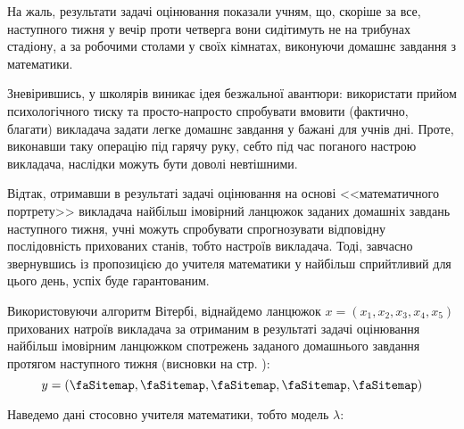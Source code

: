 \vspace{0.2cm}
\begin{mdframed}[style=text box, topline=false, bottomline=false, rightmargin=0cm, leftmargin=0cm]
    \hspace{\tabsize}
    На жаль, результати задачі оцінювання показали учням, що, скоріше за все, наступного тижня у вечір проти четверга вони сидітимуть не на трибунах стадіону, а за робочими столами у своїх кімнатах, виконуючи домашнє завдання з математики.
    
    Зневірившись, у школярів виникає ідея безжальної авантюри: використати прийом психологічного тиску та просто-напросто спробувати вмовити (фактично, благати) викладача задати легке домашнє завдання у бажані для учнів дні. Проте, виконавши таку операцію під гарячу руку, себто під час поганого настрою викладача, наслідки можуть бути доволі невтішними.
    
    Відтак, отримавши в результаті задачі оцінювання на основі <<математичного портрету>> викладача найбільш імовірний ланцюжок заданих домашніх завдань наступного тижня, учні можуть спробувати спрогнозувати відповідну послідовність прихованих станів, тобто настроїв викладача. Тоді, завчасно звернувшись із пропозицією до учителя математики у найбільш сприйтливий для цього день, успіх буде гарантованим.
\end{mdframed}

\vspace{0.2cm}
Використовуючи алгоритм Вітербі, віднайдемо ланцюжок $x=(x_1,x_2,x_3,x_4,x_5)$ прихованих натроїв викладача за отриманим в результаті задачі оцінювання найбільш імовірним ланцюжком спотрежень заданого домашнього завдання протягом наступного тижня (висновки на стр. \pageref{P=0.25559}):
\[ y=(\text{\faSitemap},\text{\faSitemap},\text{\faSitemap},\text{\faSitemap},\text{\faSitemap}) \]

Наведемо дані стосовно учителя математики, тобто модель $\lambda:$

